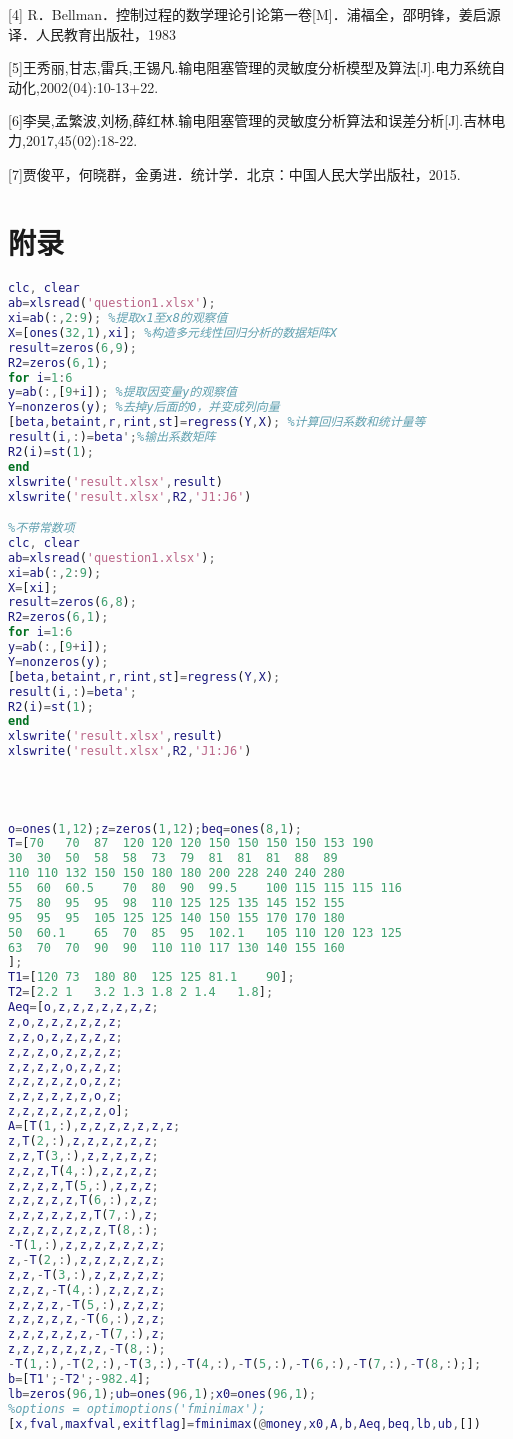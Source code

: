 \documentclass[12pt,a4paper]{ctexart}
\begin{document}
{{[4] R．Bellman．控制过程的数学理论引论第一卷[M]．浦福全，邵明锋，姜启源译．人民教育出版社，1983

[5]王秀丽,甘志,雷兵,王锡凡.输电阻塞管理的灵敏度分析模型及算法[J].电力系统自动化,2002(04):10-13+22.

[6]李昊,孟繁波,刘杨,薛红林.输电阻塞管理的灵敏度分析算法和误差分析[J].吉林电力,2017,45(02):18-22.

[7]贾俊平，何晓群，金勇进．统计学．北京：中国人民大学出版社，2015.

\section{附录}
\lstset{breaklines}%
\lstset{extendedchars=false}%

\begin{lstlisting}[language=matlab]	
%带常数项
clc, clear
ab=xlsread('question1.xlsx');
xi=ab(:,2:9); %提取x1至x8的观察值
X=[ones(32,1),xi]; %构造多元线性回归分析的数据矩阵X 
result=zeros(6,9);
R2=zeros(6,1);
for i=1:6
y=ab(:,[9+i]); %提取因变量y的观察值
Y=nonzeros(y); %去掉y后面的0，并变成列向量 
[beta,betaint,r,rint,st]=regress(Y,X); %计算回归系数和统计量等 
result(i,:)=beta';%输出系数矩阵
R2(i)=st(1);
end
xlswrite('result.xlsx',result)
xlswrite('result.xlsx',R2,'J1:J6')

%不带常数项
clc, clear
ab=xlsread('question1.xlsx'); 
xi=ab(:,2:9); 
X=[xi]; 
result=zeros(6,8);
R2=zeros(6,1);
for i=1:6
y=ab(:,[9+i]); 
Y=nonzeros(y); 
[beta,betaint,r,rint,st]=regress(Y,X);  
result(i,:)=beta';
R2(i)=st(1);
end 
xlswrite('result.xlsx',result)
xlswrite('result.xlsx',R2,'J1:J6')
	
\end{lstlisting}
~\\
\begin{lstlisting}[language=matlab]
%法一：基于0/1矩阵的规划
o=ones(1,12);z=zeros(1,12);beq=ones(8,1);
T=[70	70	87	120	120	120	150	150	150	150	153	190
30	30	50	58	58	73	79	81	81	81	88	89
110	110	132	150	150	180	180	200	228	240	240	280
55	60	60.5	70	80	90	99.5	100	115	115	115	116
75	80	95	95	98	110	125	125	135	145	152	155
95	95	95	105	125	125	140	150	155	170	170	180
50	60.1	65	70	85	95	102.1	105	110	120	123	125
63	70	70	90	90	110	110	117	130	140	155	160
];
T1=[120	73	180	80	125	125	81.1	90];
T2=[2.2	1	3.2	1.3	1.8	2 1.4	1.8];
Aeq=[o,z,z,z,z,z,z,z;
z,o,z,z,z,z,z,z;
z,z,o,z,z,z,z,z;
z,z,z,o,z,z,z,z;
z,z,z,z,o,z,z,z;
z,z,z,z,z,o,z,z;
z,z,z,z,z,z,o,z;
z,z,z,z,z,z,z,o];
A=[T(1,:),z,z,z,z,z,z,z;
z,T(2,:),z,z,z,z,z,z;
z,z,T(3,:),z,z,z,z,z;
z,z,z,T(4,:),z,z,z,z;
z,z,z,z,T(5,:),z,z,z;
z,z,z,z,z,T(6,:),z,z;
z,z,z,z,z,z,T(7,:),z;
z,z,z,z,z,z,z,T(8,:);
-T(1,:),z,z,z,z,z,z,z;
z,-T(2,:),z,z,z,z,z,z;
z,z,-T(3,:),z,z,z,z,z;
z,z,z,-T(4,:),z,z,z,z;
z,z,z,z,-T(5,:),z,z,z;
z,z,z,z,z,-T(6,:),z,z;
z,z,z,z,z,z,-T(7,:),z;
z,z,z,z,z,z,z,-T(8,:);
-T(1,:),-T(2,:),-T(3,:),-T(4,:),-T(5,:),-T(6,:),-T(7,:),-T(8,:);];
b=[T1';-T2';-982.4];
lb=zeros(96,1);ub=ones(96,1);x0=ones(96,1);
%options = optimoptions('fminimax');
[x,fval,maxfval,exitflag]=fminimax(@money,x0,A,b,Aeq,beq,lb,ub,[])


\end{lstlisting}}}
\end{document}
